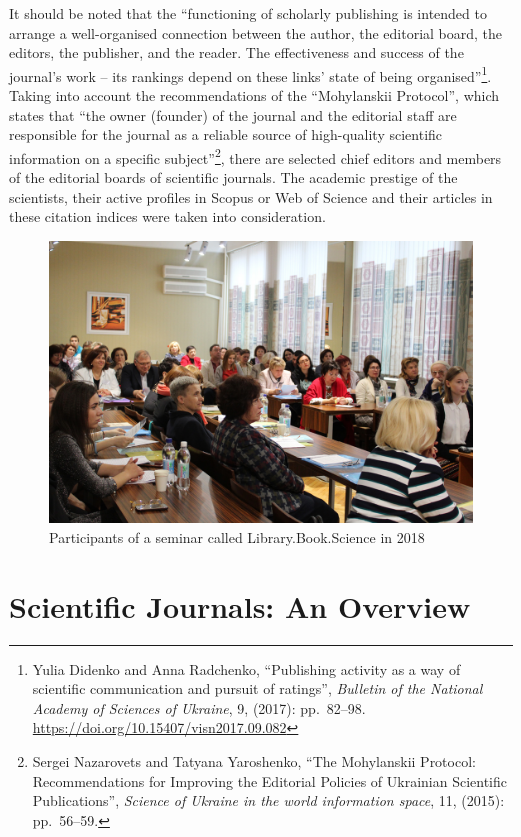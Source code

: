 \documentclass[a4paper,
fontsize=11pt,
oneside,
numbers=noperiodatend,
parskip=half-,
bibliography=totoc,
final
]{scrartcl}
\begin{document}
It should be noted that the \enquote{functioning of scholarly publishing
is intended to arrange a well-organised connection between the author,
the editorial board, the editors, the publisher, and the reader. The
effectiveness and success of the journal's work -- its rankings depend
on these links' state of being organised}\footnote{Yulia Didenko and
  Anna Radchenko, \enquote{Publishing activity as a way of scientific
  communication and pursuit of ratings}, \emph{Bulletin of the National
  Academy of Sciences of Ukraine}, 9, (2017): pp.~82--98.
  \url{https://doi.org/10.15407/visn2017.09.082}}. Taking into account
the recommendations of the \enquote{Mohylanskii Protocol}, which states
that \enquote{the owner (founder) of the journal and the editorial staff
are responsible for the journal as a reliable source of high-quality
scientific information on a specific subject}\footnote{Sergei Nazarovets
  and Tatyana Yaroshenko, \enquote{The Mohylanskii Protocol:
  Recommendations for Improving the Editorial Policies of Ukrainian
  Scientific Publications}, \emph{Science of Ukraine in the world
  information space}, 11, (2015): pp.~56--59.}, there are selected chief
editors and members of the editorial boards of scientific journals. The
academic prestige of the scientists, their active profiles in Scopus or
Web of Science and their articles in these citation indices were taken
into consideration.

\begin{figure}
\centering
\includegraphics{img/abb_2.jpg}
\caption{Participants of a seminar called Library.Book.Science in 2018}
\end{figure}

\hypertarget{scientific-journals-an-overview}{%
\section{Scientific Journals: An
Overview}\label{scientific-journals-an-overview}}
\end{document}
